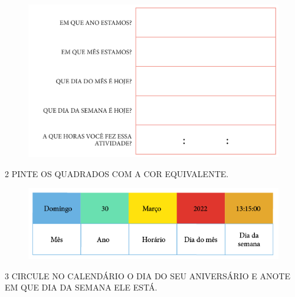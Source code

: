 \begin{figure}[htpb!]
\centering
\includegraphics[width=\textwidth]{../ilustracoes/MAT1/SAEB_1ANO_MAT_FIGURA48.png}
\end{figure}


\num{2} PINTE OS QUADRADOS COM A COR EQUIVALENTE.

\begin{figure}[htpb!]
\centering
\includegraphics[width=\textwidth]{../ilustracoes/MAT1/SAEB_1ANO_MAT_FIGURA49.png}
\end{figure}


\pagebreak
\num{3} CIRCULE NO CALENDÁRIO O DIA DO SEU ANIVERSÁRIO E ANOTE EM QUE DIA DA SEMANA ELE ESTÁ.


